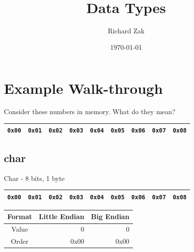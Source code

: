 \documentclass{beamer}
\title{Data Types}
\author{Richard Zak}
\institute{UMBC}
\date{\today}
\begin{document}

\section{Example Walk-through}
\begin{frame}
Consider these numbers in memory. What do they mean?
\begin{table}[]
\begin{tabular}{|l|l|l|l|l|l|l|l|l|}
\hline
 \texttt{0x00} & \texttt{0x01} & \texttt{0x02} & \texttt{0x03} & \texttt{0x04} & \texttt{0x05} & \texttt{0x06} & \texttt{0x07} &
 \texttt{0x08} \\
\hline 
\end{tabular}
\end{table}
\end{frame}

\subsection{char}
\begin{frame}{Char - 8 bits, 1 byte}

\begin{table}[]
\begin{tabular}{|l|l|l|l|l|l|l|l|l|}
\hline
 \color{red}\texttt{0x00} & \texttt{0x01} & \texttt{0x02} & \texttt{0x03} & \texttt{0x04} & \texttt{0x05} & \texttt{0x06} & \texttt{0x07} &
 \texttt{0x08} \\
\hline 
\end{tabular}
\end{table}

\begin{table}[]
\begin{tabular}{c r r}
Format & Little Endian & Big Endian \\
\hline
Value &  0   & 0 \\
Order & 0x00 & 0x00
\end{tabular}
\end{table}

\end{frame}
\end{document}

